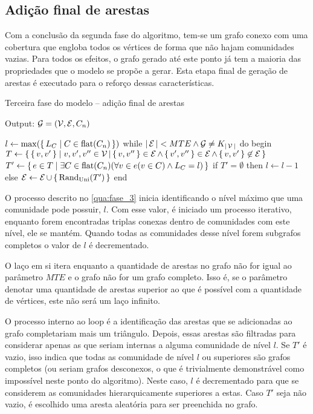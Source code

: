 \documentclass[notes.tex]{subfiles}
\begin{document}
\subsection{Adição final de arestas}

Com a conclusão da segunda fase do algoritmo, tem-se um grafo conexo com uma cobertura que engloba todos os vértices de forma que não hajam comunidades vazias.
Para todos os efeitos, o grafo gerado até este ponto já tem a maioria das propriedades que o modelo se propõe a gerar.
Esta etapa final de geração de arestas é executado para o reforço dessas características.

\begin{quadro}[htbp]
\caption{Terceira fase do modelo -- adição final de arestas}
\label{qua:fase_3}
\begin{algorithm}
Output: $\operatorname{\mathcal{G}} = (\operatorname{\mathcal{V}}, \operatorname{\mathcal{E}}, C_n)$

$l \leftarrow \max(\set{L_C | C \in \text{flat}(C_n)})$
while $|\operatorname{\mathcal{E}}| < MTE \land \operatorname{\mathcal{G}} \neq K_{|\operatorname{\mathcal{V}}|}$ do
begin
    $T \leftarrow \set{\set{v, v'} | v, v', v'' \in \operatorname{\mathcal{V}}| \set{v, v''} \in \operatorname{\mathcal{E}}\land \set{v', v''} \in \operatorname{\mathcal{E}}\land \set{v, v'} \not\in \operatorname{\mathcal{E}}}$
    $T' \leftarrow \set{e \in T | \exists C \in \text{flat}(C_n) (\forall v \in e (v \in C) \land L_C = l)}$
    if $T' = \emptyset$ then  $l \leftarrow l - 1$
    else $\operatorname{\mathcal{E}} \leftarrow \operatorname{\mathcal{E}} \cup \set{\text{Rand}_\text{Uni}(T')}$
end
\end{algorithm}
\end{quadro}

O processo descrito no \autoref{qua:fase_3} inicia identificando o nível máximo que uma comunidade pode possuir, $l$.
Com esse valor, é iniciado um processo iterativo, enquanto forem encontradas triplas conexas dentro de comunidades com este nível, ele se mantém.
Quando todas as comunidades desse nível forem subgrafos completos o valor de $l$ é decrementado.

O laço em si itera enquanto a quantidade de arestas no grafo não for igual ao parâmetro $MTE$ e o grafo não for um grafo completo. 
Isso é, se o parâmetro denotar uma quantidade de arestas superior ao que é possível com a quantidade de vértices, este não será um laço infinito.

O processo interno ao loop é a identificação das arestas que se adicionadas ao grafo completariam mais um triângulo.
Depois, essas arestas são filtradas para considerar apenas as que seriam internas a alguma comunidade de nível $l$.
Se  $T'$ é vazio, isso indica que todas as comunidade de nível  $l$ ou superiores são grafos completos (ou seriam grafos desconexos, o que é trivialmente demonstrável como impossível neste ponto do algoritmo).
Neste caso, $l$ é decrementado para que se considerem as comunidades hierarquicamente superiores a estas.
Caso  $T'$ seja não vazio, é escolhido uma aresta aleatória para ser preenchida no grafo.
\end{document}
